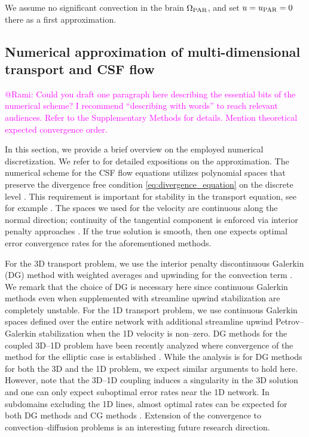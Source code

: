 \documentclass[fleqn,10pt]{wlscirep}
\newcommand{\mer}[1]{\textcolor{magenta}{#1}}
\begin{document}
We assume no significant convection in the brain $\Omega_{\rm PAR}$, and set $u = u_{\rm PAR} = 0$ there as a first approximation. 

\subsection*{Numerical approximation of multi-dimensional transport and CSF flow}

\mer{@Rami: Could you draft one paragraph here describing the essential bits of the numerical scheme? I recommend ``describing with words'' to reach relevant audiences. Refer to the Supplementary Methods for details. Mention theoretical expected convergence order.} 

In this section, we provide a brief overview on the employed numerical discretization. We refer to  for detailed expositions on the approximation. The numerical scheme for the CSF flow equations utilizes polynomial spaces that preserve the divergence free condition \eqref{eq:divergence_equation} on the discrete level \cite{hong2016robust}. This requirement is important for stability in the transport equation, see for example \cite{cesmelioglu2022compatible}. The spaces we used for the velocity are continuous along the normal direction; continuity of the tangential component is enforced via interior penalty approaches \cite{hong2016robust}.  If the true solution is smooth, then one expects optimal error convergence rates for the aforementioned methods.

For the 3D transport problem, we use the interior penalty discontinuous Galerkin (DG) method with weighted averages and upwinding for the convection term \cite{ern2009discontinuous}.  We remark that the choice of DG is necessary here since  continuous Galerkin methods even when supplemented with streamline upwind stabilization are completely unstable. For the 1D transport problem, we use continuous Galerkin spaces defined over the entire network with additional streamline upwind Petrov–Galerkin stabilization when the 1D velocity is non--zero.  DG methods for the coupled 3D--1D problem have been recently analyzed  where convergence of the method for the elliptic case is established \cite{masri2024discontinuous}. While the analysis is for DG methods for both the 3D and the 1D problem, we expect similar arguments to hold here. However, note that the 3D--1D coupling induces a singularity in the 3D solution and one can only expect suboptimal error rates near the 1D network. In subdomains excluding the 1D lines, almost optimal rates can be expected for both DG methods \cite{masri2023discontinuous} and CG methods \cite{koppl2016local}.  Extension of the convergence to convection--diffusion problems is an interesting future research direction. 
 
\end{document}
